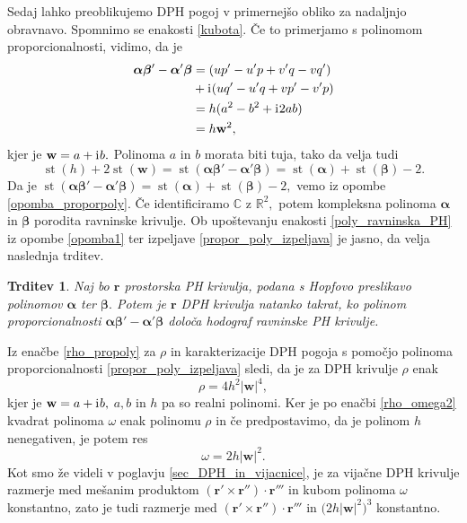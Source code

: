 \documentclass[12pt,a4paper,twoside]{article}
\newcommand{\iu}{\mathrm{i}\mkern1mu} %
\theoremstyle{definition} %
\theoremstyle{plain} %
\newtheorem{trditev}[definicija]{Trditev}
\theoremstyle{primerstyle}
\numberwithin{equation}{section}  %
\newcommand{\R}{\mathbb R}
\renewcommand{\C}{\mathbb C}
\newcommand{\rV}{\mathbf{r}}
\newcommand{\wV}{\mathbf{w}}
\newcommand{\balpha}{\boldsymbol \alpha}
\newcommand{\bbeta}{\boldsymbol \beta}
\DeclareMathOperator{\st}{st}
\begin{document}
Sedaj lahko preoblikujemo DPH pogoj v primernejšo obliko za nadaljnjo obravnavo. Spomnimo se enakosti \eqref{kubota}. Če to primerjamo s polinomom proporcionalnosti, vidimo, da je
\begin{align}
	\balpha\bbeta'-\balpha'\bbeta&=(up'-u'p+v'q-vq')\nonumber \\
	&+\iu(uq'-u'q+vp'-v'p) \label{propor_poly_izpeljava} \\
	&=h(a^2-b^2+\iu 2ab) \nonumber \\
	&=h\wV^2, \nonumber
\end{align}
kjer je $\wV=a+\iu b.$ Polinoma $a$ in $b$ morata biti tuja, tako da velja tudi
\begin{equation}
	\st(h)+2\st(\wV)=\st(\balpha\bbeta'-\balpha'\bbeta)=\st(\balpha)+\st(\bbeta)-2.
	\end{equation}
Da je $\st(\balpha\bbeta'-\balpha'\bbeta)=\st(\balpha)+\st(\bbeta)-2,$ vemo iz opombe \ref{opomba_proporpoly}. Če identificiramo $\C$ z $\R^2,$ potem kompleksna polinoma $\balpha$ in $\bbeta$ porodita ravninske krivulje. Ob upoštevanju enakosti \eqref{poly_ravninska_PH} iz opombe \ref{opomba1} ter izpeljave \eqref{propor_poly_izpeljava} je jasno, da velja naslednja trditev.
\begin{trditev}
	Naj bo $\rV$ prostorska PH krivulja, podana s Hopfovo preslikavo polinomov $\balpha$ ter $\bbeta.$ Potem je $\rV$ DPH krivulja natanko takrat, ko polinom proporcionalnosti $\balpha\bbeta'-\balpha'\bbeta$ določa hodograf ravninske PH krivulje.
\end{trditev}

Iz enačbe \eqref{rho_propoly} za $\rho$ in karakterizacije DPH pogoja s pomočjo polinoma proporcionalnosti \eqref{propor_poly_izpeljava} sledi, da je za DPH krivulje $\rho$ enak $$\rho=4h^2|\wV|^4,$$ kjer je $\wV=a+\iu b,$ $a,b$ in $h$ pa so realni polinomi. Ker je po enačbi \eqref{rho_omega2} kvadrat polinoma $\omega$ enak polinomu $\rho$ in če predpostavimo, da je polinom $h$ nenegativen, je potem res $$\omega=2h|\wV|^2.$$ Kot smo že videli v poglavju \ref{sec_DPH_in_vijacnice}, je za vijačne DPH krivulje razmerje med mešanim produktom $(\rV'\times\rV'')\cdot\rV'''$ in kubom polinoma $\omega$ konstantno, zato je tudi razmerje med $(\rV'\times\rV'')\cdot\rV'''$ in $\big(2h|\wV|^2\big)^3$ konstantno.
\end{document}

